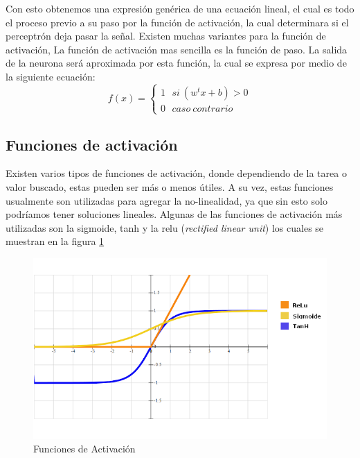 Con esto obtenemos una expresión genérica de una ecuación lineal, el cual es  todo el proceso previo a su paso por la función de activación, la cual determinara si el perceptrón deja pasar la señal.
Existen muchas variantes para la función de activación, La función de activación mas sencilla es la función de paso. La salida de la neurona será aproximada por esta función, la cual se expresa por medio de la siguiente ecuación:
\begin{equation}
f(x)=\left\lbrace\begin{array}{c} 1~~~si~ (w^{t} x+b) > 0 \\ 0~~~caso~contrario~~ \end{array}\right.
\end{equation}

\subsection{Funciones de activación}
Existen varios tipos de funciones de activación, donde dependiendo de la tarea o valor buscado, estas pueden ser más o menos útiles. A su vez, estas funciones usualmente son utilizadas para agregar la no-linealidad, ya que sin esto solo podríamos tener soluciones lineales. Algunas de las funciones de activación más utilizadas son la sigmoide, tanh y la relu (\textit{rectified linear unit}) los cuales se muestran en la figura \ref{fig:funcionesActivacion}
\begin{figure}[h!]
    \centering
    \includegraphics[width=1\textwidth]{capitulos/img/funcion_activacion.png}
    \caption{Funciones de Activación}
    \label{fig:funcionesActivacion}
\end{figure}
\newpage
